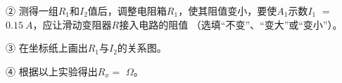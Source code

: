 \begin{enumerate}[leftmargin=0em]
② 测得一组$ R_{1} $和$ I_{2} $值后，调整电阻箱$ R_{1} $，使其阻值变小，要使$ A_{1} $示数$ I_{1} $ $ = $ $ 0.15\ A $，应让滑动变阻器$ R $接入电路的阻值  （选填“不变”、“变大”或“变小”）。

③ 在坐标纸上画出$ R_{1} $与$ I_{2} $的关系图。


④ 根据以上实验得出$ R_{x} = $  $ \Omega $。









\end{enumerate}

